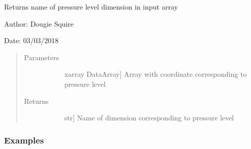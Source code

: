 \documentclass[letterpaper,10pt,english]{sphinxmanual}
\begin{document}
\begin{fulllineitems}
\label{\detokenize{utils_doc:utils.get_plevel_name}}
Returns name of pressure level dimension in input array

\begin{DUlineblock}{0em}
\item[] Author: Dougie Squire
\item[] Date: 03/03/2018
\end{DUlineblock}
\begin{quote}\begin{description}
\item[{Parameters}] \leavevmode\begin{description}
\item[{}] \leavevmode{[}xarray DataArray{]}
Array with coordinate corresponding to pressure level

\end{description}

\item[{Returns}] \leavevmode\begin{description}
\item[{}] \leavevmode{[}str{]}
Name of dimension corresponding to pressure level

\end{description}

\end{description}\end{quote}
\subsubsection*{Examples}


\end{fulllineitems}
\end{document}
